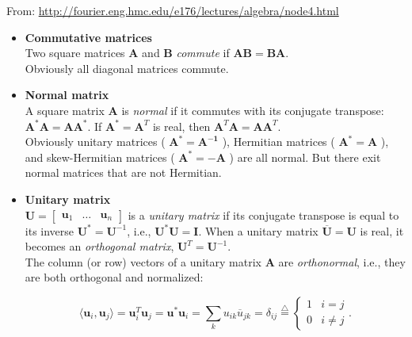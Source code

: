 \documentclass[10pt,b5paper,titlepage]{book}
\newcommand*\eqd{\stackrel{\triangle}{=}}
\begin{document}
From: \url{http://fourier.eng.hmc.edu/e176/lectures/algebra/node4.html}\\

\begin{itemize}
    \item \textbf{Commutative matrices}\\

        Two square matrices $\mathbf{A}$ and $\mathbf{B}$ \textit{commute}
        if $\mathbf{A}\mathbf{B} = \mathbf{B}\mathbf{A}$.\\

        Obviously all diagonal matrices commute.

    \item \textbf{Normal matrix}\\

        A square matrix $\mathbf{A}$ is \textit{normal} if it commutes with its
        conjugate transpose: $\mathbf{A}^{*}\mathbf{A} = \mathbf{A}\mathbf{A}^{*}$.
        If $\mathbf{A}^{*} = \mathbf{A}^{T}$ is real, then
        $\mathbf{A}^{T}\mathbf{A} = \mathbf{A}\mathbf{A}^{T}$.\\

        Obviously unitary matrices ( $\mathbf{A^{*} = \mathbf{A}^{-1}}$ ),
        Hermitian matrices ( $\mathbf{A}^{*} = \mathbf{A}$ ), and skew-Hermitian
        matrices ( $\mathbf{A}^{*} = -\mathbf{A}$ ) are all normal. But there exit
        normal matrices that are not Hermitian.

    \item \textbf{Unitary matrix}\\

        $\mathbf{U} = \begin{bmatrix} \mathbf{u}_1 & \ldots & \mathbf{u}_n \end{bmatrix}$ is a
        \textit{unitary matrix} if its conjugate transpose is equal to its inverse
        $\mathbf{U}^{*} = \mathbf{U}^{-1}$, i.e., $\mathbf{U}^{*}\mathbf{U} = \mathbf{I}$.
        When a unitary matrix $\overline{\mathbf{U}} = \mathbf{U}$ is real, it
        becomes an \textit{orthogonal matrix}, $\mathbf{U}^{T} = \mathbf{U}^{-1}$.\\

        The column (or row) vectors of a unitary matrix $\mathbf{A}$ are
        \textit{orthonormal}, i.e., they are both orthogonal and normalized:

        \begin{equation}
            \langle \mathbf{u}_{i}, \mathbf{u}_{j} \rangle
            = \mathbf{u}_{i}^{T}\mathbf{u}_{j}
            = \mathbf{u}^{*}\mathbf{u}_{i}
            = \sum_{k} u_{ik} \overline{u}_{jk}
            = \delta_{ij}
            \eqd \left\{
                \begin{array}{lr}
                    1 & i = j\\
                    0 & i \neq j
                \end{array}
            \right.
        .\end{equation}


\end{itemize}
\end{document}
